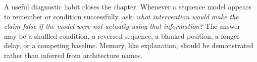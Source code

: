 A useful diagnostic habit closes the chapter. Whenever a sequence model appears to remember or condition successfully, ask: \emph{what intervention would make the claim false if the model were not actually using that information?} The answer may be a shuffled condition, a reversed sequence, a blanked position, a longer delay, or a competing baseline. Memory, like explanation, should be demonstrated rather than inferred from architecture names.
